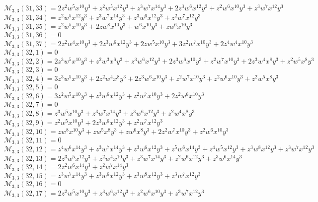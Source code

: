 \documentclass[12pt]{memoireuqam1.3}
\begin{document}
$\mathcal{M}_{3,3}(31,33)=2z^2w^5x^{10}y^3+z^2w^5x^{12}y^3+z^3w^7x^{14}y^3+2z^3w^6x^{12}y^3+z^2w^6x^{10}y^3+z^3w^7x^{12}y^3$\\
$\mathcal{M}_{3,3}(31,34)=z^2w^5x^{12}y^3+z^3w^7x^{14}y^3+z^3w^6x^{12}y^3+z^2w^7x^{12}y^3$\\
$\mathcal{M}_{3,3}(31,35)=z^2w^5x^{10}y^3+2zw^8x^{10}y^3+w^6x^{10}y^3+zw^6x^{10}y^3$\\
$\mathcal{M}_{3,3}(31,36)=0$\\
$\mathcal{M}_{3,3}(31,37)=2z^2w^4x^{10}y^3+2z^3w^6x^{12}y^3+2zw^5x^{10}y^3+3z^2w^7x^{10}y^3+2z^4w^4x^{10}y^3$\\
$\mathcal{M}_{3,3}(32,1)=0$\\
$\mathcal{M}_{3,3}(32,2)=2z^3w^5x^{10}y^3+z^2w^3x^6y^3+z^3w^6x^{12}y^3+2z^3w^6x^{10}y^3+z^2w^7x^{10}y^3+2z^3w^4x^8y^3+z^2w^5x^8y^3$\\
$\mathcal{M}_{3,3}(32,3)=0$\\
$\mathcal{M}_{3,3}(32,4)=3z^3w^5x^{10}y^3+2z^2w^4x^8y^3+2z^3w^6x^{10}y^3+z^2w^7x^{10}y^3+z^2w^6x^{10}y^3+z^2w^5x^8y^3$\\
$\mathcal{M}_{3,3}(32,5)=0$\\
$\mathcal{M}_{3,3}(32,6)=3z^2w^5x^{10}y^3+z^3w^6x^{12}y^3+z^2w^7x^{10}y^3+2z^2w^6x^{10}y^3$\\
$\mathcal{M}_{3,3}(32,7)=0$\\
$\mathcal{M}_{3,3}(32,8)=z^3w^5x^{10}y^3+z^3w^7x^{14}y^3+z^3w^6x^{12}y^3+z^2w^4x^8y^3$\\
$\mathcal{M}_{3,3}(32,9)=z^2w^5x^{10}y^3+2z^3w^6x^{12}y^3+z^2w^7x^{12}y^3$\\
$\mathcal{M}_{3,3}(32,10)=zw^8x^{10}y^3+zw^5x^8y^3+zw^6x^8y^3+2z^2w^7x^{10}y^3+z^2w^6x^{10}y^3$\\
$\mathcal{M}_{3,3}(32,11)=0$\\
$\mathcal{M}_{3,3}(32,12)=z^4w^6x^{14}y^3+z^3w^7x^{14}y^3+z^3w^6x^{12}y^3+z^5w^6x^{14}y^3+z^4w^5x^{12}y^3+z^3w^8x^{12}y^3+z^3w^7x^{12}y^3$\\
$\mathcal{M}_{3,3}(32,13)=2z^3w^5x^{12}y^3+z^2w^4x^{10}y^3+z^3w^7x^{14}y^3+z^2w^6x^{12}y^3+z^3w^6x^{14}y^3$\\
$\mathcal{M}_{3,3}(32,14)=2z^2w^6x^{14}y^3+z^2w^7x^{14}y^3$\\
$\mathcal{M}_{3,3}(32,15)=z^3w^7x^{14}y^3+z^3w^6x^{12}y^3+z^3w^8x^{12}y^3+z^3w^7x^{12}y^3$\\
$\mathcal{M}_{3,3}(32,16)=0$\\
$\mathcal{M}_{3,3}(32,17)=2z^2w^5x^{10}y^3+z^3w^6x^{12}y^3+z^2w^6x^{10}y^3+z^3w^7x^{12}y^3$\\
\end{document}
